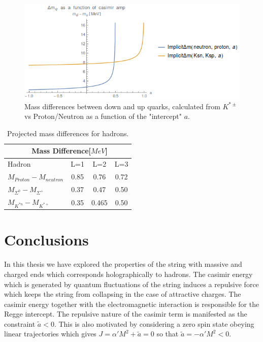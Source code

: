 \documentclass[11pt,a4paper]{article}
\begin{document}
\begin{figure}[h]
\centering
\includegraphics[width=\linewidth]{figures/KaonMassDifferences}
\caption{Mass differences between down and up quarks, calculated from $K^{*\pm}$ vs Proton/Neutron as a function of the "intercept" $a$.}
\label{fig:kaonmassdiff}
\end{figure}

\begin{table}
\centering
\begin{tabular}{|l|c|c|c|}
\hline
\multicolumn{3}{r}{Mass Difference[$MeV$]} \\ \hline
Hadron & L=1 & L=2 & L=3  \\ \hline
$M_{Proton}-M_{neutron}$ & 0.85 & 0.76 & 0.72 \\ \hline
$M_{\Sigma^0}-M_{\Sigma^+}$ & 0.37 & 0.47 & 0.50 \\ \hline
$M_{K^{*n}}-M_{K^{*+}}$ & 0.35 & 0.465 & 0.50 \\ \hline
\end{tabular}
\caption{Projected mass differences for hadrons.}
\label{tab:projectedmassdiff}
\end{table}
\FloatBarrier
\section{Conclusions}

In this thesis we have explored the properties of the string with massive and charged ends which corresponds holographically to hadrons. The casimir energy which is generated by quantum fluctuations of the string induces a repulsive force which keeps the string from collapsing in the case of attractive charges. The casimir energy together with the electromagnetic interaction is responsible for the Regge intercept. The repulsive nature of the casimir term is manifested as the constraint $\tilde{a}<0$. This is also motivated by considering a zero spin state obeying linear trajectories which gives $J=\alpha'M^2+\tilde{a}=0$ so that $\tilde{a}=-\alpha'M^2<0$.
\end{document}
